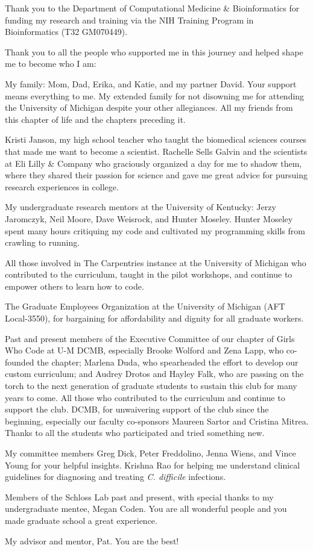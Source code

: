 Thank you to the Department of Computational Medicine \& Bioinformatics for
funding my research and training via the NIH Training Program in Bioinformatics
(T32 GM070449).

Thank you to all the people who supported me in this journey and helped shape me
to become who I am:

My family: Mom, Dad, Erika, and Katie, and my partner David.
Your support means everything to me.
My extended family for not disowning me for attending the University of Michigan
despite your other allegiances.
All my friends from this chapter of life and the chapters preceding it.

Kristi Janson, my high school teacher who taught the biomedical sciences
courses that made me want to become a scientist.
Rachelle Sells Galvin and the scientists at Eli Lilly \& Company
who graciously organized a day for me to shadow them,
where they shared their passion for science and gave me great advice for
pursuing research experiences in college.

My undergraduate research mentors at the University of Kentucky:
Jerzy Jaromczyk, Neil Moore, Dave Weisrock, and Hunter Moseley.
Hunter Moseley spent many hours critiquing my code and cultivated my programming
skills from crawling to running.

All those involved in The Carpentries instance at the University of Michigan who
contributed to the curriculum, taught in the pilot workshops, and continue to
empower others to learn how to code.

The Graduate Employees Organization at the University of Michigan (AFT Local-3550),
for bargaining for affordability and dignity for all graduate workers.

Past and present members of the Executive Committee of
our chapter of Girls Who Code at U-M DCMB, especially
Brooke Wolford and Zena Lapp, who co-founded the chapter;
Marlena Duda, who spearheaded the effort to develop our custom curriculum; and
Audrey Drotos and Hayley Falk, who are passing on the torch to the next
generation of graduate students to sustain this club for many years to come.
All those who contributed to the curriculum and continue to support the club.
DCMB, for unwaivering support of the club since the beginning, especially our
faculty co-sponsors Maureen Sartor and Cristina Mitrea.
Thanks to all the students who participated and tried something new.

My committee members Greg Dick, Peter Freddolino, Jenna Wiens, and Vince Young
for your helpful insights.
Krishna Rao for helping me understand clinical guidelines for diagnosing
and treating \textit{C. difficile} infections.

Members of the Schloss Lab past and present, with special thanks to my
undergraduate mentee, Megan Coden.
You are all wonderful people and you made graduate school a great experience.

My advisor and mentor, Pat. You are the best!
